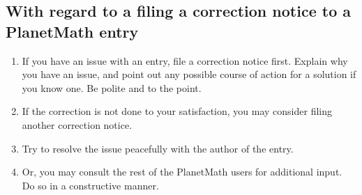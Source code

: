 \subsection{With regard to a filing a correction notice to a PlanetMath entry}
\begin{enumerate}
\item If you have an issue with an entry, file a correction notice first. Explain why you have an issue, and point out any possible course of action for a solution if you know one. Be polite and to the point.
\item If the correction is not done to your satisfaction, you may consider filing another correction notice.
\item Try to resolve the issue peacefully with the author of the entry. 
\item Or, you may consult the rest of the PlanetMath users for additional input. Do so in a constructive manner.
\end{enumerate}

